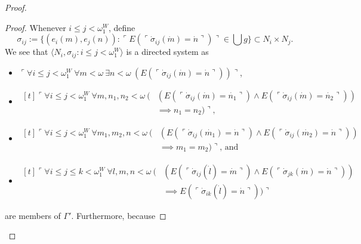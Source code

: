 \documentclass[12pt]{article}
\numberwithin{equation}{section}
\begin{document}
\begin{proof}
\begin{proof}
Whenever $i \leq j < \omega_1^W$, define
\begin{equation*}
    \sigma_{ij} := \{(e_i(m), e_j(n)) : \ulcorner E(\ulcorner \dot{\sigma}_{ij}(\dot{m}) = \dot{n} \urcorner) \urcorner \in \bigcup g\} \subset N_i \times N_j \text{.}
\end{equation*}
We see that $\langle N_i, \sigma_{ij} : i \leq  j < \omega_1^{W} \rangle$ is a directed system as
\begin{itemize}
    \item $\ulcorner \forall i \leq j < \omega_1^W \ \forall m < \omega \ \exists n < \omega \ (E(\ulcorner \dot{\sigma}_{ij}(\dot{m}) = \dot{n} \urcorner)) \urcorner$,
    \item
    \!
    $\begin{aligned}[t]
        \ulcorner \forall i \leq j < \omega_1^W \ \forall m, n_1, n_2 < \omega \ ( & (E(\ulcorner \dot{\sigma}_{ij}(\dot{m}) = \dot{n_1} \urcorner) \wedge E(\ulcorner \dot{\sigma}_{ij}(\dot{m}) = \dot{n_2} \urcorner)) \\
        & \implies n_1 = n_2) \urcorner \text{,}
    \end{aligned}$
    \item
    \!
    $\begin{aligned}[t]
        \ulcorner \forall i \leq j < \omega_1^W \ \forall m_1, m_2, n < \omega \ ( & (E(\ulcorner \dot{\sigma}_{ij}(\dot{m_1}) = \dot{n} \urcorner) \wedge E(\ulcorner \dot{\sigma}_{ij}(\dot{m_2}) = \dot{n} \urcorner)) \\
        & \implies m_1 = m_2) \urcorner \text{, and}
    \end{aligned}$
    \item
    \!
    $\begin{aligned}[t]
        \ulcorner \forall i \leq j \leq k < \omega_1^W \ \forall l, m, n < \omega \ ( & (E(\ulcorner \dot{\sigma}_{ij}(\dot{l}) = \dot{m} \urcorner) \wedge E(\ulcorner \dot{\sigma}_{jk}(\dot{m}) = \dot{n} \urcorner)) \\
        & \implies E(\ulcorner \dot{\sigma}_{ik}(\dot{l}) = \dot{n} \urcorner)) \urcorner
    \end{aligned}$
\end{itemize}
are members of $\Gamma'$. Furthermore, because  
\end{proof}
\end{proof}
\end{document}
